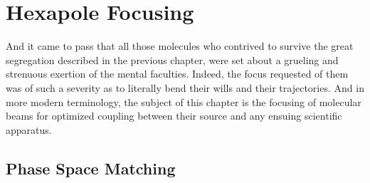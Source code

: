 \ifx\justbeingincluded\undefined


\fi

\chapter{Hexapole Focusing}
\label{chapter:hex}

And it came to pass that all those molecules who contrived to survive the great segregation described in the previous chapter, were set about a grueling and strenuous exertion of the mental faculties. Indeed, the focus requested of them was of such a severity as to literally bend their wills and their trajectories. And in more modern terminology, the subject of this chapter is the focusing of molecular beams for optimized coupling between their source and any ensuing scientific apparatus.

\section{Phase Space Matching}

